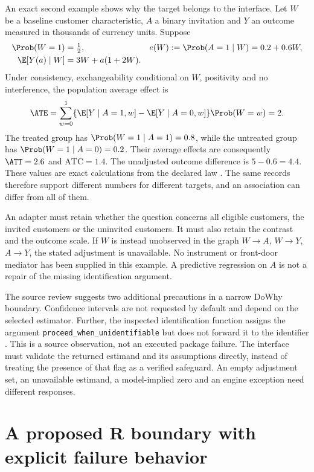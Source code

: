 An exact second example shows why the target belongs to the interface.
Let $W$ be a baseline customer characteristic, $A$ a binary invitation and
$Y$ an outcome measured in thousands of currency units. Suppose
\begin{align}
 \Prob(W=1)&=\tfrac12, &
 e(W):=\Prob(A=1\mid W)&=0.2+0.6W,\\
 \E[Y(a)\mid W]&=3W+a(1+2W).&&
 \label{exec13:target-law}
\end{align}
Under consistency, exchangeability conditional on $W$, positivity and no
interference, the population average effect is
\begin{equation}
 \ATE=\sum_{w=0}^1
 \{\E[Y\mid A=1,w]-\E[Y\mid A=0,w]\}\Prob(W=w)=2.
 \label{exec13:ate}
\end{equation}
The treated group has $\Prob(W=1\mid A=1)=0.8$, while the untreated group
has $\Prob(W=1\mid A=0)=0.2$. Their average effects are consequently
$\ATT=2.6$ and $\mathrm{ATC}=1.4$. The unadjusted outcome difference is
$5-0.6=4.4$. These values are exact calculations from the declared law
\citep{exec13_examples}. The same records therefore support different
numbers for different targets, and an association can differ from all of them.

An adapter must retain whether the question concerns all eligible customers,
the invited customers or the uninvited customers. It must also retain the
contrast and the outcome scale. If $W$ is instead unobserved in the graph
$W\rightarrow A$, $W\rightarrow Y$, $A\rightarrow Y$, the stated adjustment
is unavailable. No instrument or front-door mediator has been supplied in
this example. A predictive regression on $A$ is not a repair of the missing
identification argument.

The source review suggests two additional precautions in a narrow DoWhy
boundary. Confidence intervals are not requested by default and depend on
the selected estimator. Further, the inspected identification function assigns
the argument \texttt{proceed\_when\_unidentifiable} but does not forward it
to the identifier \citep{exec13_dowhy}. This is a source observation, not
an executed package failure. The interface must validate the returned
estimand and its assumptions directly, instead of treating the presence of
that flag as a verified safeguard. An empty adjustment set, an unavailable
estimand, a model-implied zero and an engine exception need different responses.

\section{A proposed R boundary with explicit failure behavior}

